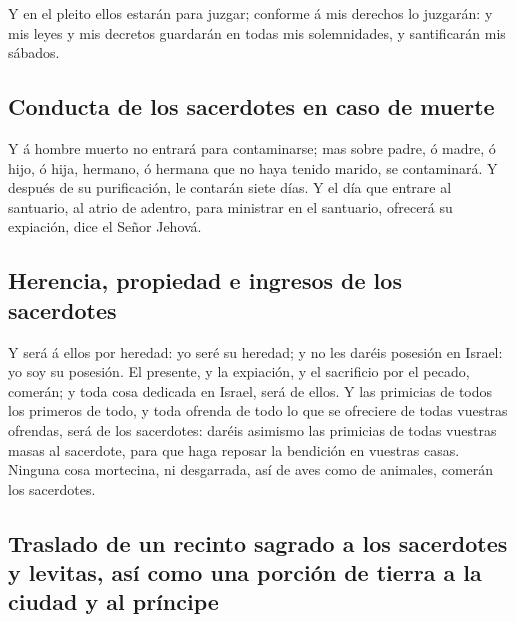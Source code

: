  Y en el pleito ellos estarán para juzgar; conforme á mis
derechos lo juzgarán: y mis leyes y mis decretos guardarán en todas mis
solemnidades, y santificarán mis sábados.

\hypertarget{conducta-de-los-sacerdotes-en-caso-de-muerte}{%
\subsection{Conducta de los sacerdotes en caso de
muerte}\label{conducta-de-los-sacerdotes-en-caso-de-muerte}}

 Y á hombre muerto no entrará para contaminarse; mas
sobre padre, ó madre, ó hijo, ó hija, hermano, ó hermana que no haya
tenido marido, se contaminará.  Y después de su
purificación, le contarán siete días.  Y el día que
entrare al santuario, al atrio de adentro, para ministrar en el
santuario, ofrecerá su expiación, dice el Señor Jehová.

\hypertarget{herencia-propiedad-e-ingresos-de-los-sacerdotes}{%
\subsection{Herencia, propiedad e ingresos de los
sacerdotes}\label{herencia-propiedad-e-ingresos-de-los-sacerdotes}}

 Y será á ellos por heredad: yo seré su heredad; y no les
daréis posesión en Israel: yo soy su posesión.  El
presente, y la expiación, y el sacrificio por el pecado, comerán; y toda
cosa dedicada en Israel, será de ellos.  Y las primicias
de todos los primeros de todo, y toda ofrenda de todo lo que se
ofreciere de todas vuestras ofrendas, será de los sacerdotes: daréis
asimismo las primicias de todas vuestras masas al sacerdote, para que
haga reposar la bendición en vuestras casas.  Ninguna
cosa mortecina, ni desgarrada, así de aves como de animales, comerán los
sacerdotes.

\hypertarget{traslado-de-un-recinto-sagrado-a-los-sacerdotes-y-levitas-asuxed-como-una-porciuxf3n-de-tierra-a-la-ciudad-y-al-pruxedncipe}{%
\subsection{Traslado de un recinto sagrado a los sacerdotes y levitas,
así como una porción de tierra a la ciudad y al
príncipe}\label{traslado-de-un-recinto-sagrado-a-los-sacerdotes-y-levitas-asuxed-como-una-porciuxf3n-de-tierra-a-la-ciudad-y-al-pruxedncipe}}

